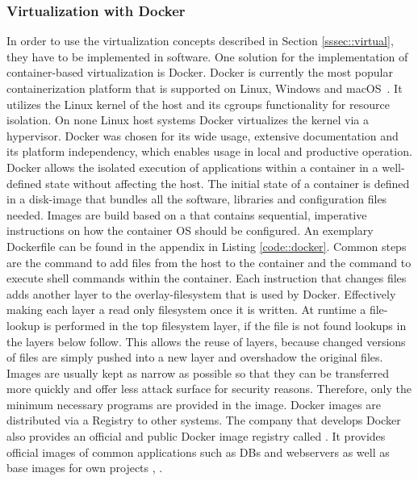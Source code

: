 \documentclass[12pt, a4paper]{article}
\begin{document}
        \subsubsection{Virtualization with Docker}\label{sssec::docker}
        In order to use the virtualization concepts described in Section \ref{sssec::virtual}, they have to be implemented in software. One solution for the implementation of container-based virtualization is Docker. Docker is currently the most popular containerization platform that is supported on Linux, Windows and macOS~\cite{docker_share}. It utilizes the Linux kernel of the host and its cgroups functionality for resource isolation. On none Linux host systems Docker virtualizes the kernel via a hypervisor. Docker was chosen for its wide usage, extensive documentation and its platform independency, which enables usage in local and productive operation.\newline
        Docker allows the isolated execution of applications within a container in a well-defined state without affecting the host. The initial state of a container is defined in a disk-image that bundles all the software, libraries and configuration files needed. Images are build based on a  that contains sequential, imperative instructions on how the container \ac{OS} should be configured. An exemplary Dockerfile can be found in the appendix in Listing \ref{code::docker}. Common steps are the  command to add files from the host to the container and the  command to execute shell commands within the container. Each instruction that changes files adds another layer to the overlay-filesystem that is used by Docker. Effectively making each layer a read only filesystem once it is written. At runtime a file-lookup is performed in the top filesystem layer, if the file is not found lookups in the layers below follow. This allows the reuse of layers, because changed versions of files are simply pushed into a new layer and overshadow the original files. Images are usually kept as narrow as possible so that they can be transferred more quickly and offer less attack surface for security reasons. Therefore, only the minimum necessary programs are provided in the image. Docker images are distributed via a Registry to other systems. The company that develops Docker also provides an official and public Docker image registry called . It provides official images of common applications such as \acl{DB}s and webservers as well as base images for own projects \cite{docker2020}, \cite{dockerdocs}.\newline
\end{document}

